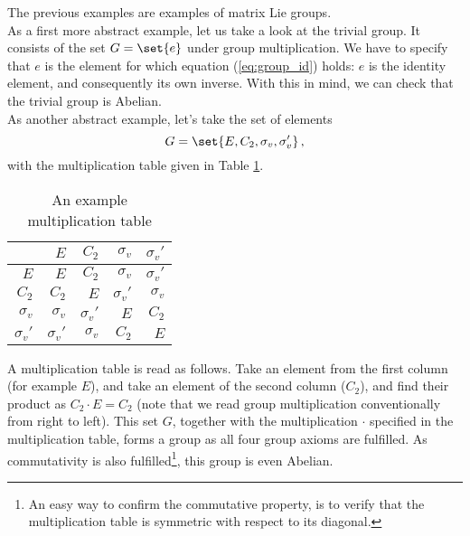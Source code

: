         The previous examples are examples of matrix Lie groups. \\

        As a first more abstract example, let us take a look at the trivial group. It consists of the set $G = \set{e}$ under group multiplication. We have to specify that $e$ is the element for which equation (\ref{eq:group_id}) holds: $e$ is the identity element, and consequently its own inverse. With this in mind, we can check that the trivial group is Abelian. \\

        As another abstract example, let's take the set of elements
        \begin{equation}
            G = \set{E, C_2, \sigma_v, \sigma_v'} \thinspace ,
        \end{equation}
        with the multiplication table given in Table \ref{table:multiplication_table_C2v}.
        \begin{table}[H] \centering
            \begin{tabular}{r|rrrr}
                            & $E$           & $C_2$         & $\sigma_v$    & $\sigma_v'$   \\ \hline

                $E$         & $E$           & $C_2$         & $\sigma_v$    & $\sigma_v'$   \\
                $C_2$       & $C_2$         & $E$           & $\sigma_v'$   & $\sigma_v$    \\
                $\sigma_v$  & $\sigma_v$    & $\sigma_v'$   & $E$           & $C_2$         \\
                $\sigma_v'$ & $\sigma_v'$   & $\sigma_v$    & $C_2$         & $E$
            \end{tabular}
            \caption{An example multiplication table}
            \label{table:multiplication_table_C2v}
        \end{table}
        A multiplication table is read as follows. Take an element from the first column (for example $E$), and take an element of the second column ($C_2$), and find their product as $C_2 \cdot E = C_2$ (note that we read group multiplication conventionally from right to left). This set $G$, together with the multiplication $\cdot$ specified in the multiplication table, forms a group as all four group axioms are fulfilled. As commutativity is also fulfilled\footnote{An easy way to confirm the commutative property, is to verify that the multiplication table is symmetric with respect to its diagonal.}, this group is even Abelian. \\

